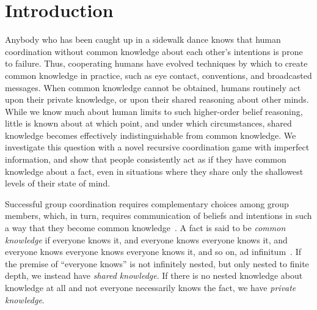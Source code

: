 \section{Introduction}
Anybody who has been caught up in a sidewalk dance knows that human coordination without common knowledge about each other's intentions is prone to failure. Thus, cooperating humans have evolved techniques by which to create common knowledge in practice, such as eye contact, conventions, and broadcasted messages. When common knowledge cannot be obtained, humans routinely act upon their private knowledge, or upon their shared reasoning about other minds. While we know much about human limits to such higher-order belief reasoning, little is known about at which point, and under which circumstances, shared knowledge becomes effectively indistinguishable from common knowledge. We investigate this question with a novel recursive coordination game with imperfect information, and show that people consistently act as if they have common knowledge about a fact, even in situations where they share only the shallowest levels of their state of mind.  

Successful group coordination requires complementary choices among group members, which, in turn, requires communication of beliefs and intentions in such a way that they become common knowledge~\cite{fagin1995reasoning}. A fact is said to be \textit{common knowledge} if everyone knows it, and everyone knows everyone knows it, and everyone knows everyone knows everyone knows it, and so on, ad infinitum~\cite{lewis1969convention, clark1981definite, schelling1980strategy, aumann1976agreeing}. If the premise of  ``everyone knows'' is not infinitely nested, but only nested to finite depth, we instead have \emph{shared knowledge}. If there is no nested knowledge about knowledge at all and not everyone necessarily knows the fact, we have \emph{private knowledge}.

